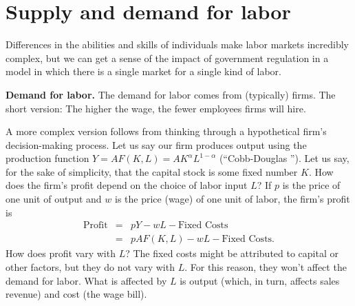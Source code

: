 \begin{comment}
In a typical case, the categories are expanded as
follows: (ia)~employed in same job as last period, (ib)~employed
in different job, (ii)~unemployed, \index{labor!unemployed population}
 and (iii)~not in labor force.
Related information is collected from firms.  A firm is said to
create jobs if it lists more positions (filled or not) than in the
previous period and destroy jobs if there are fewer.  Total {\it
job creation\/} for the economy as a whole is the total number of
positions added by firms that create jobs.  Similarly, total {\it
job destruction\/} is the total number of positions lost by firms
that destroy jobs.  The astonishing feature of flow data is how
much churning goes on: millions of people gain and lose jobs every
month, and millions of jobs are created and destroyed, whether the
economy is growing or shrinking.
\end{comment}



\section{Supply and demand for labor}

Differences in the abilities and skills of individuals
make labor markets incredibly complex,
but we can get a sense of the impact of government regulation
in a model in which there is a single market for a single kind of labor.

\textbf{Demand for labor.}
The   demand for labor  comes from (typically) firms.
The short version:  The higher the wage,
the fewer employees firms will hire.

A more complex version follows from thinking through
a hypothetical firm's decision-making process.
Let us say our firm produces output using the production function
$Y= AF(K,L)=AK^{\alpha}L^{1-\alpha}$ (``Cobb-Douglas  '').
Let us say, for the sake of simplicity, that the
capital stock is some fixed number $K$. How does the firm's profit
depend on the choice of labor input $L$? If $p$ is the price of
one unit of output and $w$ is the price (wage) of one unit of
labor, the firm's profit is
%
\begin{eqnarray*}
    \mbox{Profit} &=& p Y - w L - \mbox{Fixed Costs} \\
                  &=& p A F(K,L) - w L - \mbox{Fixed Costs} .
\end{eqnarray*}
%
How does profit vary with $L$? The fixed costs might be attributed
to capital or other factors, but they do not vary with $L$.
For this reason, they won't affect the demand for labor.  What is
affected by $L$ is output (which, in turn, affects sales revenue)
and cost (the wage bill).

